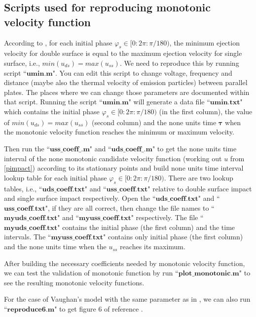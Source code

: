 \documentclass[a4paper,11pt]{article}
\begin{document}
\subsection{Scripts used for reproducing monotonic velocity function}
According to \cite{NS}, for each initial phase $\varphi_{s}\in [0: 2\pi : \pi/180)$, the minimum ejection velocity for double surface is equal to the maximum ejection velocity for single surface, i.e., $min(u_{ds})=max(u_{ss})$. We need to reproduce this by running script ``$\mathbf{umin.m}$". You can edit this script to change voltage, frequency and distance (maybe also the thermal velocity of emission particles) between parallel plates. The places where we can change those parameters are documented within that script. Running the script ``$\mathbf{umin.m}$" will generate a data file ``$\mathbf{umin.txt}$" which contains the initial phase $\varphi_{s}\in [0: 2\pi : \pi/180)$ (in the first column), the value of $min(u_{ds})=max(u_{ss})$ (second column) and the none units time $\mathbf{\tau}$ when the monotonic velocity function reaches the minimum or maximum velocity.

Then run the ``$\mathbf{uss\_coeff\_.m}$" and ``$\mathbf{uds\_coeff\_.m}$" to get the none units time interval of the none monotonic candidate velocity function
(working out $u$ from \eqref{pimpact}) according to its stationary points and build none units time interval lookup table for each initial phase $\varphi_{s}\in [0: 2\pi : \pi/180)$. There are two lookup tables, i.e., ``$\mathbf{uds\_coeff.txt}$" and ``$\mathbf{uss\_coeff.txt}$" relative to double surface impact and single surface impact respectively. Open the  ``$\mathbf{uds\_coeff.txt}$" and ``$\mathbf{uss\_coeff.txt}$", if they are all correct, then change the file names to ``$\mathbf{myuds\_coeff.txt}$" and  ``$\mathbf{myuss\_coeff.txt}$" respectively. The file ``$\mathbf{myuds\_coeff.txt}$" contains the initial phase (the first column) and the time intervals. The ``$\mathbf{myuss\_coeff.txt}$" contains only initial phase (the first column) and the none units time when the $u_{ss}$ reaches its maximum.

After building the necessary coefficients needed by monotonic velocity function, we can test the validation of monotonic function by run ``$\mathbf{plot\_monotonic.m}$" to see the resulting monotonic velocity functions.

For the case of Vaughan's model with the same parameter as in \cite{NS}, we can also run ``$\mathbf{reproduce6.m}$" to get figure 6 of reference \cite{NS}.
\end{document}

